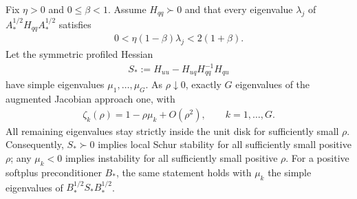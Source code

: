 \begin{theorem}
\label{thm:rigid-slow-spectrum}
Fix $\eta>0$ and $0\le\beta<1$. Assume $H_{qq}\succ0$ and that every eigenvalue $\lambda_j$ of $A_*^{1/2}H_{qq}A_*^{1/2}$ satisfies
\begin{align}
 0<\eta(1-\beta)\lambda_j<2(1+\beta).
\end{align}
Let the symmetric profiled Hessian
\begin{align}
 S_*:=H_{uu}-H_{uq}H_{qq}^{-1}H_{qu}
\end{align}
have simple eigenvalues $\mu_1,\ldots,\mu_G$. As $\rho\downarrow0$, exactly $G$ eigenvalues of the augmented Jacobian approach one, with
\begin{align}\label{eq:rigid-slow-spectrum}
 \zeta_k(\rho)=1-\rho\mu_k+O(\rho^2),\qquad k=1,\ldots,G.
\end{align}
All remaining eigenvalues stay strictly inside the unit disk for sufficiently small $\rho$. Consequently, $S_*\succ0$ implies local Schur stability for all sufficiently small positive $\rho$; any $\mu_k<0$ implies instability for all sufficiently small positive $\rho$. For a positive softplus preconditioner $B_*$, the same statement holds with $\mu_k$ the simple eigenvalues of $B_*^{1/2}S_*B_*^{1/2}$.
\end{theorem}
